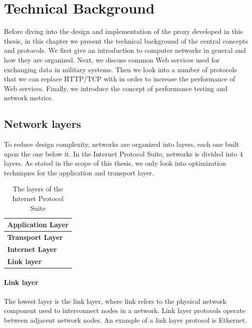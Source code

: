 \chapter{Technical Background}

Before diving into the design and implementation of the proxy developed in this
thesis, in this chapter we present the technical background of the central
concepts and protocols. We first give an introduction to computer networks in
general and how they are organized. Next, we discuss common Web services used
for exchanging data in military systems. Then we look into a number of protocols
that we can replace HTTP/TCP with in order to increase the performance of Web
services. Finally, we introduce the concept of performance testing and network
metrics.

\section{Network layers}

To reduce design complexity, networks are organized into layers, each one built
upon the one below it. In the Internet Protocol Suite\cite{rfc-1122}, networks
is divided into 4 layers. As stated in the scope of this thesis, we only look
into optimization techniques for the application and transport layer.

\begin{table}[h]
\begin{tabularx}{\textwidth}{| X |}
\hline
  \textbf{Application Layer} \\ \hline
  \textbf{Transport Layer} \\ \hline
  \textbf{Internet Layer} \\ \hline
  \textbf{Link layer} \\ \hline
\end{tabularx}
\caption{The layers of the Internet Protocol Suite}
\label{figure-network-layers}
\end{table}

\subsubsection{Link layer}

The lowest layer is the link layer, where link refers to the physical
network component used to interconnect nodes in a network. Link layer protocols
operate between adjacent network nodes. An example of a link layer protocol is
Ethernet.

